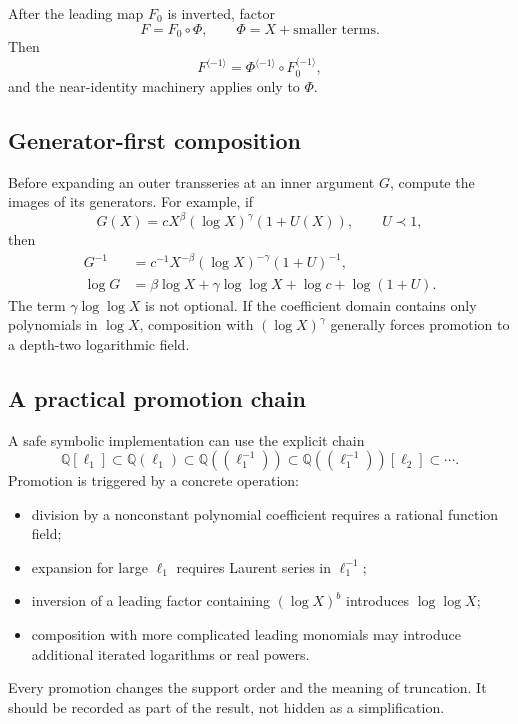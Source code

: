 \documentclass[11pt,a4paper]{article}
\numberwithin{equation}{section}
\theoremstyle{definition}
\theoremstyle{remark}
\begin{document}
After the leading map \(F_0\) is inverted, factor
\begin{equation}\label{eq:dominant-factorization}
  F=F_0\circ\Phi,
  \qquad \Phi=X+\text{smaller terms}.
\end{equation}
Then
\begin{equation}\label{eq:dominant-factorization-inverse}
  F^{\langle-1\rangle}
  =\Phi^{\langle-1\rangle}\circ F_0^{\langle-1\rangle},
\end{equation}
and the near-identity machinery applies only to \(\Phi\).

\subsection{Generator-first composition}

Before expanding an outer transseries at an inner argument \(G\), compute
the images of its generators.  For example, if
\begin{equation}\label{eq:general-inner-leading}
  G(X)=cX^\beta(\log X)^\gamma(1+U(X)),
  \qquad U\prec1,
\end{equation}
then
\begin{align}
  G^{-1}&=c^{-1}X^{-\beta}(\log X)^{-\gamma}(1+U)^{-1},
  \label{eq:generator-inverse-image}\\
  \log G&=\beta\log X+\gamma\log\log X+\log c+\log(1+U).
  \label{eq:generator-log-image}
\end{align}
The term \(\gamma\log\log X\) is not optional.  If the coefficient domain
contains only polynomials in \(\log X\), composition with
\((\log X)^\gamma\) generally forces promotion to a depth-two logarithmic
field.

\subsection{A practical promotion chain}

A safe symbolic implementation can use the explicit chain
\begin{equation}\label{eq:promotion-chain}
 \mathbb Q[\ell_1]
 \subset\mathbb Q(\ell_1)
 \subset\mathbb Q((\ell_1^{-1}))
 \subset\mathbb Q((\ell_1^{-1}))[\ell_2]
 \subset\cdots.
\end{equation}
Promotion is triggered by a concrete operation:
\begin{itemize}
\item division by a nonconstant polynomial coefficient requires a rational
      function field;
\item expansion for large \(\ell_1\) requires Laurent series in
      \(\ell_1^{-1}\);
\item inversion of a leading factor containing \((\log X)^b\) introduces
      \(\log\log X\);
\item composition with more complicated leading monomials may introduce
      additional iterated logarithms or real powers.
\end{itemize}
Every promotion changes the support order and the meaning of truncation.  It
should be recorded as part of the result, not hidden as a simplification.
\end{document}
